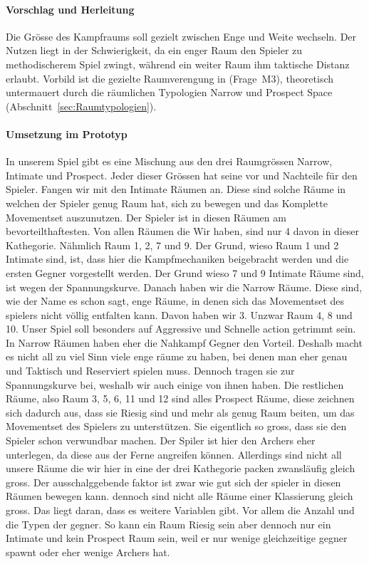 \documentclass[../Main.tex]{subfiles}
\begin{document}
\paragraph{Vorschlag und Herleitung}
Die Grösse des Kampfraums soll gezielt zwischen Enge und Weite wechseln. Der Nutzen liegt in der Schwierigkeit, da ein enger Raum den Spieler zu methodischerem Spiel zwingt, während ein weiter Raum ihm taktische Distanz erlaubt. Vorbild ist die gezielte Raumverengung in  (Frage~M3), theoretisch untermauert durch die räumlichen Typologien Narrow und Prospect Space (Abschnitt~\ref{sec:Raumtypologien}).

\paragraph{Umsetzung im Prototyp}
In unserem Spiel gibt es eine Mischung aus den drei Raumgrössen Narrow, Intimate und Prospect. Jeder dieser Grössen hat seine vor und Nachteile für den Spieler. Fangen wir mit den Intimate Räumen an. Diese sind solche Räume in welchen der Spieler genug Raum hat, sich zu bewegen und das Komplette Movementset auszunutzen. Der Spieler ist in diesen Räumen am bevorteilthaftesten. Von allen Räumen die Wir haben, sind nur 4 davon in dieser Kathegorie. Nähmlich Raum 1, 2, 7 und 9. Der Grund, wieso Raum 1 und 2 Intimate sind, ist, dass hier die Kampfmechaniken beigebracht werden und die ersten Gegner vorgestellt werden. Der Grund wieso 7 und 9 Intimate Räume sind, ist wegen der Spannungskurve. Danach haben wir die Narrow Räume. Diese sind, wie der Name es schon sagt, enge Räume, in denen sich das Movementset des spielers nicht völlig entfalten kann. Davon haben wir 3. Unzwar Raum 4, 8 und 10. Unser Spiel soll besonders auf Aggressive und Schnelle action getrimmt sein. In Narrow Räumen haben eher die Nahkampf Gegner den Vorteil. Deshalb macht es nicht all zu viel Sinn viele enge räume zu haben, bei denen man eher genau und Taktisch und Reserviert spielen muss. Dennoch tragen sie zur Spannungskurve bei, weshalb wir auch einige von ihnen haben. Die restlichen Räume, also Raum 3, 5, 6, 11 und 12 sind alles Prospect Räume, diese zeichnen sich dadurch aus, dass sie Riesig sind und mehr als genug Raum beiten, um das Movementset des Spielers zu unterstützen. Sie eigentlich so gross, dass sie den Spieler schon verwundbar machen. Der Spiler ist hier den Archers eher unterlegen, da diese aus der Ferne angreifen können. Allerdings sind nicht all unsere Räume die wir hier in eine der drei Kathegorie packen zwansläufig gleich gross. Der ausschalggebende faktor ist zwar wie gut sich der spieler in diesen Räumen bewegen kann. dennoch sind nicht alle Räume einer Klassierung gleich gross. Das liegt daran, dass es weitere Variablen gibt. Vor allem die Anzahl und die Typen der gegner. So kann ein Raum Riesig sein aber dennoch nur ein Intimate und kein Prospect Raum sein, weil er nur wenige gleichzeitige gegner spawnt oder eher wenige Archers hat.
\end{document}
